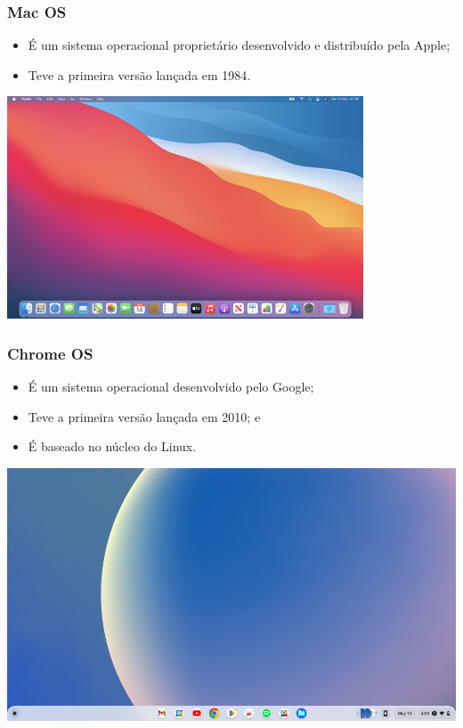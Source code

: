 \documentclass[aspectratio=169]{beamer} %
\begin{document}
\begin{frame}
	\frametitle{Mac OS}
	
	\begin{itemize}
		\item É um sistema operacional proprietário desenvolvido e distribuído pela Apple;
		\item Teve a primeira versão lançada em 1984.
	\end{itemize}\vfill
	
	\begin{center}
		\includegraphics[scale=0.45]{img/macosbig}
	\end{center}
\end{frame}

\begin{frame}
	\frametitle{Chrome OS}
	
	\begin{itemize}
		\item É um sistema operacional desenvolvido pelo Google;
		\item Teve a primeira versão lançada em 2010; e
		\item É baseado no núcleo do Linux. 
	\end{itemize}\vfill
	
	\begin{center}
		\includegraphics[scale=0.2]{img/chromeos}
	\end{center}
\end{frame}
\end{document}
